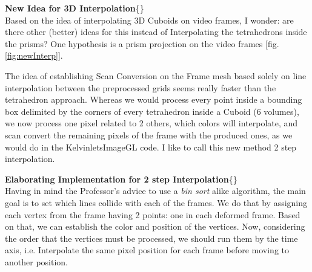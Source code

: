 \documentclass[12pt, a4paper]{report}
\newenvironment{loggentry}[2]%
{\noindent\textbf{#2}\newline\{\marginnote{#1}\}\newline\\}{\vspace{1.0cm}}
\begin{document}
	\begin{loggentry}{28-05-2019}{New Idea for 3D Interpolation}
		Based on the idea of interpolating 3D Cuboids on video frames, I wonder:
		are there other (better) ideas for this instead of Interpolating the tetrahedrons inside the prisms?
		One hypothesis is a prism projection on the video frames [fig.\ref{fig:newInterp}].	

		The idea of establishing Scan Conversion on the Frame mesh based solely on line interpolation between the preprocessed grids seems really faster than the tetrahedron approach.
		Whereas we would process every point inside a bounding box delimited by the corners of every tetrahedron inside a Cuboid (6 volumes), we now process one pixel related to 2 others, which colors will interpolate, and scan convert the remaining pixels of the frame with the produced ones, as we would do in the KelvinletsImageGL code.
		I like to call this new method 2 step interpolation.  
	\end{loggentry}

	\begin{loggentry}{30-05-2019}{Elaborating Implementation for 2 step Interpolation}
			Having in mind the Professor's advice to use a \textit{bin sort} alike algorithm, the main goal is to set which lines collide with each of the frames.
			We do that by assigning each vertex from the frame having 2 points: one in each deformed frame.
			Based on that, we can establish the color and position of the vertices.
			Now, considering the order that the vertices must be processed, we should run them by the time axis, i.e. Interpolate the same pixel position for each frame before moving to another position.    
	\end{loggentry}
\end{document}
